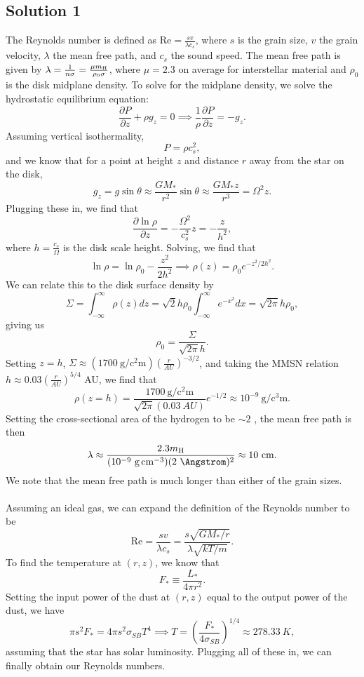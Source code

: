 \documentclass[11pt]{article}
\newenvironment{tight_enumerate}{
    \begin{enumerate}[label=(\alph*)]
    \setlength{\itemsep}{3pt}
    \setlength{\parskip}{0pt}}
    {\end{enumerate}}
\begin{document}
\subsection*{Solution 1}
\begin{tight_enumerate}
\item The Reynolds number is defined as $\text{Re} = \frac{sv}{{\lambda}c_s}$, where $s$ is the grain size, $v$ the grain velocity, $\lambda$ the mean free path, and $c_s$ the sound speed. The mean free path is given by $\lambda = \frac{1}{n\sigma} = \frac{{\mu}m_{\ce{H}}}{{\rho_0}\sigma}$, where $\mu = 2.3$ on average for interstellar material and $\rho_0$ is the disk midplane density. To solve for the midplane density, we solve the hydrostatic equilibrium equation:
\[\frac{\partial P}{\partial z} + \rho g_z = 0 \implies \frac{1}{\rho}\frac{\partial P}{\partial z} = -g_z.\]
Assuming vertical isothermality, 
\[P = \rho c_s^2,\]
and we know that for a point at height $z$ and distance $r$ away from the star on the disk, 
\[g_z = g\sin\theta \approx \frac{GM_*}{r^2}\sin\theta \approx \frac{G M_* z}{r^3} = \Omega^2 z.\]
Plugging these in, we find that 
\[\frac{\partial \ln\rho}{\partial z} = -\frac{\Omega^2}{c_s^2}z = -\frac{z}{h^2},\]
where $h = \frac{c_s}{\Omega}$ is the disk scale height. Solving, we find that 
\[\ln\rho = \ln\rho_0 - \frac{z^2}{2h^2} \implies \rho(z) = \rho_0 e^{-z^2/2h^2}.\]
We can relate this to the disk surface density by 
\[\Sigma = \int_{-\infty}^{\infty} \rho(z)dz = \sqrt{2}h\rho_0\int_{-\infty}^{\infty}e^{-x^2}dx = \sqrt{2\pi}h\rho_0,\]
giving us 
\[\rho_0 = \frac{\Sigma}{\sqrt{2\pi}h}.\]
Setting $z = h$, $\Sigma \approx (1700\ \si{\gram\per\square\centi\meter})\left(\frac{r}{\si{AU}}\right)^{-3/2}$, and taking the MMSN relation $h \approx 0.03\left(\frac{r}{\si{AU}}\right)^{5/4}$ \si{AU}, we find that 
\[\rho(z=h) = \frac{1700\ \si{\gram\per\square\centi\meter}}{\sqrt{2\pi}(0.03\ \si{AU})}e^{-1/2} \approx 10^{-9}\ \si{\gram\per\cubic\centi\meter}.\]
Setting the cross-sectional area of the hydrogen to be ${\sim}2$ \si{\Angstrom}, the mean free path is then 
\[\lambda \approx \frac{2.3m_{\ce{H}}}{(10^{-9}\ \si{\gram\per\cubic\centi\meter})(2\ \si{\Angstrom})^2} \approx 10\ \si{\centi\meter}.\]
We note that the mean free path is much longer than either of the grain sizes.\\
\\
Assuming an ideal gas, we can expand the definition of the Reynolds number to be 
\[\text{Re} = \frac{sv}{\lambda c_s} = \frac{s\sqrt{GM_*/r}}{\lambda\sqrt{kT/m}}.\]
To find the temperature at $(r,z)$, we know that 
\[F_* \equiv \frac{L_*}{4\pi r^2}.\] 
Setting the input power of the dust at $(r,z)$ equal to the output power of the dust, we have 
\[\pi s^2 F_* = 4\pi s^2 \sigma_{SB}T^4 \implies T = \left(\frac{F_*}{4\sigma_{SB}}\right)^{1/4} \approx 278.33\ \si{K},\]
assuming that the star has solar luminosity. Plugging all of these in, we can finally obtain our Reynolds numbers.\\


\end{tight_enumerate}
\end{document}
